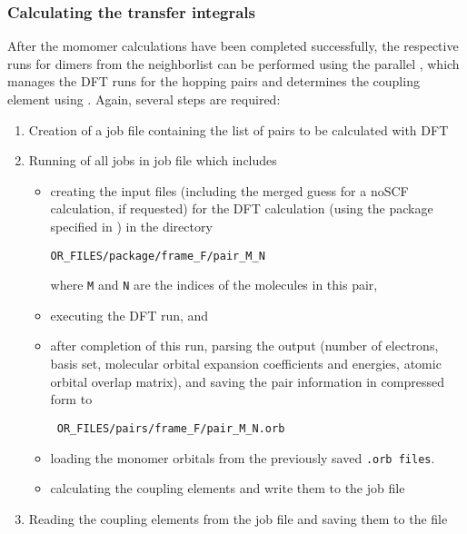 \subsubsection{Calculating the transfer integrals}
\label{sec:idft}
After the momomer calculations have been completed successfully, the respective runs for dimers from the neighborlist can be performed using the parallel  \calculator, which manages the DFT runs for the hopping pairs and determines the coupling element using \dipro. Again, several steps are required:
\begin{enumerate}
\item Creation of a job file containing the list of pairs to be calculated with DFT 
\item Running of all jobs in job file 
which includes
\begin{itemize}
\item creating the input files (including the merged guess for a noSCF calculation, if requested) for the DFT calculation (using the package specified in \xmloptions) in the directory 
\begin{verbatim}
OR_FILES/package/frame_F/pair_M_N
\end{verbatim}
where {\tt M} and {\tt N} are the indices of the molecules in this pair,
\item executing the DFT run, and
\item after completion of this run, parsing the output (number of electrons, basis set, molecular orbital expansion coefficients and energies, atomic orbital overlap matrix), and saving the pair information in compressed form to
\begin{verbatim}
 OR_FILES/pairs/frame_F/pair_M_N.orb 
\end{verbatim}
\item loading the monomer orbitals from the previously saved {\tt *.orb files}.
\item calculating the coupling elements and write them to the job file
\end{itemize}
\item Reading the coupling elements from the job file and saving them to the \sqlstate file
\end{enumerate}




